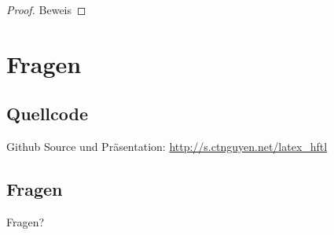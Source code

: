\documentclass[xcolor=x11names,compress]{beamer} %
\renewcommand{\(}{\begin{columns}}
\renewcommand{\)}{\end{columns}}
\newcommand{\<}[1]{\begin{column}{#1}}
\renewcommand{\>}{\end{column}}
\begin{document}
		\begin{frame}
			\begin{proof}
        Beweis
\end{proof}
		\end{frame}

\section{Fragen}
	\subsection{Quellcode}
		\begin{frame}
			Github Source und Präsentation:
			\href{http://s.ctnguyen.net/latex_hftl}{http://s.ctnguyen.net/latex\_hftl}
		\end{frame}

	\subsection{Fragen}
		\begin{frame}
			\huge{Fragen?}
		\end{frame}
\end{document}
